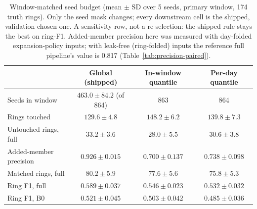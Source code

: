 \begin{table}[t]
\centering
\caption{Window-matched seed budget (mean $\pm$ SD over 5 seeds, primary window, 174 truth
rings). Only the seed mask changes; every downstream cell is the shipped, validation-chosen
one. A sensitivity row, not a re-selection: the shipped rule stays the best on ring-F1. Added-member precision here was measured with day-folded expansion-policy inputs; with leak-free (ring-folded) inputs the reference full pipeline's value is 0.817 (Table~\ref{tab:precision-paired}).}
\label{tab:window-budget}
\small
\begin{tabular}{lccc}
\toprule
 & Global (shipped) & In-window quantile & Per-day quantile \\
\midrule
Seeds in window & $463.0 \pm 84.2$ (of 864) & 863 & 864 \\ %
Rings touched & $129.6 \pm 4.8$ & $148.2 \pm 6.2$ & $139.8 \pm 7.3$ \\ %
Untouched rings, full & $33.2 \pm 3.6$ & $28.0 \pm 5.5$ & $30.6 \pm 3.8$ \\ %
Added-member precision & $0.926 \pm 0.015$ & $0.700 \pm 0.137$ & $0.738 \pm 0.098$ \\ %
Matched rings, full & $80.2 \pm 5.9$ & $77.6 \pm 5.6$ & $75.8 \pm 5.3$ \\ %
Ring F1, full & $0.589 \pm 0.037$ & $0.546 \pm 0.023$ & $0.532 \pm 0.032$ \\ %
Ring F1, B0 & $0.521 \pm 0.045$ & $0.503 \pm 0.042$ & $0.485 \pm 0.036$ \\ %
\bottomrule
\end{tabular}
\end{table}
